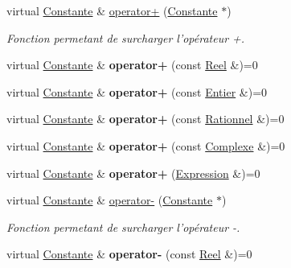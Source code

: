 \begin{DoxyCompactItemize}
\item 
virtual \hyperlink{class_constante}{Constante} \& \hyperlink{class_constante_a2346d7608b9732c34f96d01bed7de6c1}{operator+} (\hyperlink{class_constante}{Constante} $\ast$)
\begin{DoxyCompactList}\small\item\em Fonction permetant de surcharger l'opérateur +. \end{DoxyCompactList}\item 
\hypertarget{class_constante_adb952a391e582f997a96d848e461e281}{virtual \hyperlink{class_constante}{Constante} \& {\bfseries operator+} (const \hyperlink{class_reel}{Reel} \&)=0}\label{class_constante_adb952a391e582f997a96d848e461e281}

\item 
\hypertarget{class_constante_a2402e4cd1b0d9d9618f05fe5876f090f}{virtual \hyperlink{class_constante}{Constante} \& {\bfseries operator+} (const \hyperlink{class_entier}{Entier} \&)=0}\label{class_constante_a2402e4cd1b0d9d9618f05fe5876f090f}

\item 
\hypertarget{class_constante_ad778cc57ca2edc0bc09dc63455029451}{virtual \hyperlink{class_constante}{Constante} \& {\bfseries operator+} (const \hyperlink{class_rationnel}{Rationnel} \&)=0}\label{class_constante_ad778cc57ca2edc0bc09dc63455029451}

\item 
\hypertarget{class_constante_a753901cb5653de58594c74038536f56b}{virtual \hyperlink{class_constante}{Constante} \& {\bfseries operator+} (const \hyperlink{class_complexe}{Complexe} \&)=0}\label{class_constante_a753901cb5653de58594c74038536f56b}

\item 
\hypertarget{class_constante_a03fc01b8fdf5b8945ae8b72209bc1285}{virtual \hyperlink{class_constante}{Constante} \& {\bfseries operator+} (\hyperlink{class_expression}{Expression} \&)=0}\label{class_constante_a03fc01b8fdf5b8945ae8b72209bc1285}

\item 
virtual \hyperlink{class_constante}{Constante} \& \hyperlink{class_constante_a24a763c775e35399bff4441b2f41db12}{operator-\/} (\hyperlink{class_constante}{Constante} $\ast$)
\begin{DoxyCompactList}\small\item\em Fonction permetant de surcharger l'opérateur -\/. \end{DoxyCompactList}\item 
\hypertarget{class_constante_a6eb6194c90dce85b0e8d55cb39733f6e}{virtual \hyperlink{class_constante}{Constante} \& {\bfseries operator-\/} (const \hyperlink{class_reel}{Reel} \&)=0}\label{class_constante_a6eb6194c90dce85b0e8d55cb39733f6e}


\end{DoxyCompactItemize}

